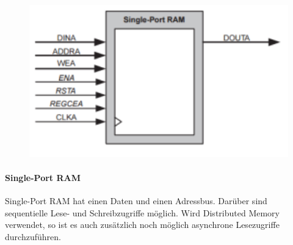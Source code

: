 \begin{minipage}{0.3\textwidth}
    \begin{figure}[H]
        \includegraphics[width=1\textwidth]{images/singleportram.png}
    \end{figure}
\end{minipage}
\hfill
\begin{minipage}{0.65\textwidth}
    \paragraph{Single-Port RAM}
    Single-Port RAM hat einen Daten und einen Adressbus. Darüber sind sequentielle Lese- und Schreibzugriffe möglich. Wird Distributed Memory verwendet, so ist es auch zusätzlich noch möglich asynchrone Lesezugriffe durchzuführen. \ \\ \ \\ \ \\
\end{minipage}

